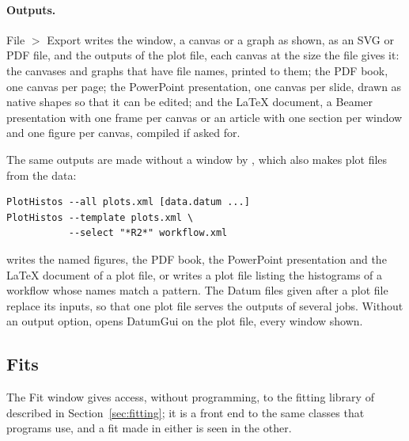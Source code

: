 \paragraph{Outputs.}
File $>$ Export writes the window, a canvas or a graph as shown, as an SVG or PDF file, and the outputs of the plot
file, each canvas at the size the file gives it: the canvases and graphs that have file names, printed to them; the
PDF book, one canvas per page; the PowerPoint presentation, one canvas per slide, drawn as native shapes so that it
can be edited; and the \LaTeX{} document, a Beamer presentation with one frame per canvas or an article with one
section per window and one figure per canvas, compiled if asked for.

\label{sec:plotbatch}
The same outputs are made without a window by , which also makes plot files from the data:
{\footnotesize
\begin{verbatim}
PlotHistos --all plots.xml [data.datum ...]
PlotHistos --template plots.xml \
           --select "*R2*" workflow.xml
\end{verbatim}}
\noindent writes the named figures, the PDF book, the PowerPoint presentation and the \LaTeX{} document of a plot file,
or writes a plot file listing the histograms of a workflow whose names match a pattern.
\noindent The Datum files given after a plot file replace its inputs, so that one plot file serves the outputs of
several jobs. Without an output option, \code{PlotHistos} opens DatumGui on the plot file, every window shown.

\subsection{Fits}
\label{sec:guifits}

The Fit window gives access, without programming, to the fitting library of \Datum{} described in
Section~\ref{sec:fitting}; it is a front end to the same classes that programs use, and a fit made in either is
seen in the other.

